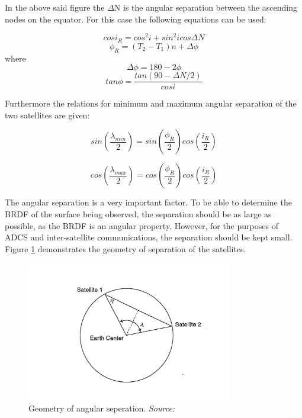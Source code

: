 In the above said figure the $\Delta$N is the angular separation between the ascending nodes on the equator. For this case the following equations can be used:

\begin{equation}
cos i_R = cos^2i+sin^2i cos \Delta N
\label{ir}
\end{equation}
\begin{equation}
\phi_R = (T_2-T_1)n+ \Delta \phi
\label{phir}
\end{equation}
where
\begin{equation}
\Delta \phi = 180 - 2 \phi
\label{deltaPhi}
\end{equation}
\begin{equation}
tan \phi = \frac{tan ( 90 - \Delta N / 2)}{cos i}
\label{tanphi}
\end{equation}

Furthermore the relations for minimum and maximum angular separation of the two satellites are given:

\begin{equation}
sin ( \frac{\lambda_{min}}{2} ) = sin ( \frac{ \phi_R }{2} ) cos ( \frac{i_R}{2} )
\label{lambdamin}
\end{equation}

\begin{equation}
cos ( \frac{\lambda_{max}}{2} ) = cos ( \frac{ \phi_R }{2} ) cos ( \frac{i_R}{2} )
\label{lambdamax}
\end{equation}

The angular separation is a very important factor. To be able to determine the BRDF of the surface being observed, the separation should be as large as possible, as the BRDF is an angular property. However, for the purposes of \ac{ADCS} and inter-satellite communications, the separation should be kept small. Figure \ref{fig:earthangle} demonstrates the geometry of separation of the satellites.

\begin{figure}[ht!]
\centering
\includegraphics[width=0.8\textwidth, angle=0]{chapters/img/geometry.png}

\caption{Geometry of angular seperation. \emph{Source: \cite{constDesign}}}
\label{fig:earthangle}
\end{figure}

